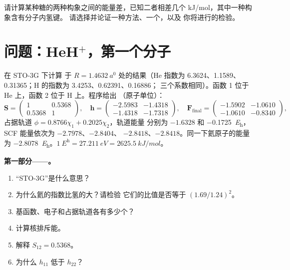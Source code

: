 \begin{exercise}[$\star\star\star$]\label{exo:b3:computational-chemistry:12}
请计算某种糖的两种构象之间的能量差，已知二者相差几个
\unit{kJ/mol}，其中一种构象含有分子内氢键。
请选择并论证一种方法、一个，以及
你将进行的检验。
\end{exercise}

\section{问题：HeH\texorpdfstring{$^+$}{+}，第一个分子}

\begin{problem}
\label{pb:b3:computational-chemistry:1}
在 STO-3G 下计算  于 $R = \qty{1.4632}{\bohr}$ 处的结果（He
指数为 6.3624、1.1589、0.31365；H 的指数为 3.4253、0.62391、0.16886；
三个系数相同）。函数 1 位于 He 上，函数 2 位于 H 上。程序给出
（原子单位）：
\[
\mathbf S = \begin{pmatrix}1 & 0.5368\\ 0.5368 & 1\end{pmatrix},\quad
\mathbf h = \begin{pmatrix}-2.5983 & -1.4318\\ -1.4318 & -1.7318\end{pmatrix},\quad
\mathbf F_{\mathrm{final}} = \begin{pmatrix}-1.5902 & -1.0610\\ -1.0610 & -0.8340
\end{pmatrix},
\]
占据轨道 $\phi = 0.8766\chi_1 + 0.2025\chi_2$，轨道能量
分别为 $-1.6328$ 和 \qty{-0.1725}{\hartree}，SCF 能量依次为 $-2.7978$、$-2.8404$、
$-2.8418$、$-2.8418$。同一下氦原子的能量为
\qty{-2.8078}{\hartree}。$\qty{1}{\hartree} = \qty{27.211}{eV} =
\qty{2625.5}{kJ/mol}$。

\medskip\noindent\textbf{第一部分——。}
\begin{enumerate}
  \item “STO-3G”是什么意思？
  \item 为什么氦的指数比氢的大？请检验
        它们的比值是否等于 $(1.69/1.24)^2$。
  \item 基函数、电子和占据轨道各有多少个？
  \item 计算核排斥能。
  \item 解释 $S_{12} = 0.5368$。
  \item 为什么 $h_{11}$ 低于 $h_{22}$？
\end{enumerate}


\end{problem}

